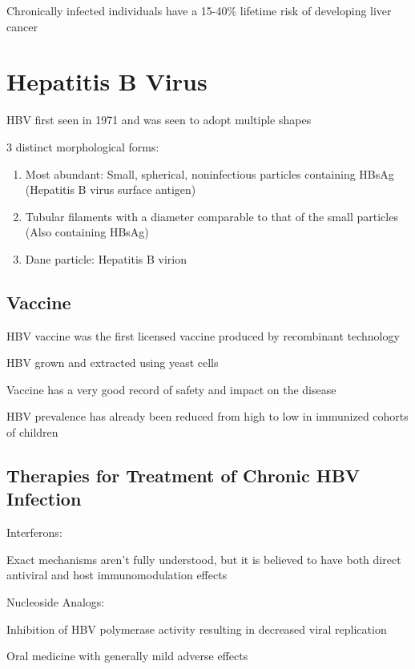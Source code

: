 \documentclass{notes}
\begin{document}
Chronically infected individuals have a 15-40\% lifetime risk of developing liver cancer

\section{Hepatitis B Virus}

HBV first seen in 1971 and was seen to adopt multiple shapes

3 distinct morphological forms:

\begin{enumerate}
    \item Most abundant: Small, spherical, noninfectious particles containing HBsAg (Hepatitis B virus surface antigen)
    \item Tubular filaments with a diameter comparable to that of the small particles (Also containing HBsAg)
    \item Dane particle: Hepatitis B virion
\end{enumerate}


\subsection{Vaccine}

HBV vaccine was the first licensed vaccine produced by recombinant technology

\tab HBV grown and extracted using yeast cells

Vaccine has a very good record of safety and impact on the disease

\tab HBV prevalence has already been reduced from high to low in immunized cohorts of children

\subsection{Therapies for Treatment of Chronic HBV Infection}

Interferons:

\tab Exact mechanisms aren't fully understood, but it is believed to have both direct antiviral and host immunomodulation effects

Nucleoside Analogs:

\tab Inhibition of HBV polymerase activity resulting in decreased viral replication

\tab Oral medicine with generally mild adverse effects
\end{document}
